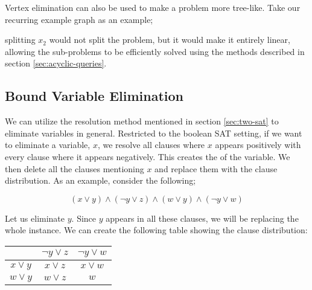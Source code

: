 Vertex elimination can also be used to make a problem more tree-like. Take our recurring example graph as an example;

\begin{center}
\end{center}

splitting $x_2$ would not split the problem, but it would make it entirely linear, allowing the sub-problems to be efficiently solved using the methods described in section \ref{sec:acyclic-queries}.

\subsection{Bound Variable Elimination}\label{sec:var-elim}

We can utilize the resolution method mentioned in section \ref{sec:two-sat} to eliminate variables in general. Restricted to the boolean SAT setting, if we want to eliminate a variable, $x$, we resolve all clauses where $x$ appears positively with every clause where it appears negatively. This creates the  of the variable. We then delete all the clauses mentioning $x$ and replace them with the clause distribution. As an example, consider the following;

\begin{equation}
    (x \vee y) \wedge (\neg y \vee z) \wedge (w \vee y) \wedge (\neg y \vee w)
\end{equation}

Let us eliminate $y$. Since $y$ appears in all these clauses, we will be replacing the whole instance. We can create the following table showing the clause distribution:

\begin{table}[h]
    \centering
    \begin{tabular}{c|c|c}
        & \( \neg y \vee z \) & \( \neg y \vee w \) \\
        \hline
        \( x \vee y \) & \( x \vee z \) & \( x \vee w \) \\
        \hline
        \( w \vee y \) & \( w \vee z \) & \( w \) \\
    \end{tabular}
    \label{tab:clause-distribution}
\end{table}

